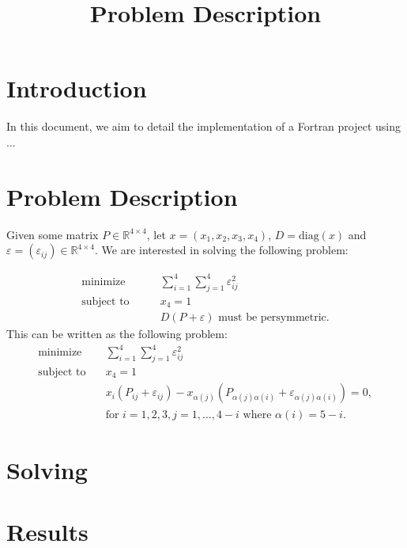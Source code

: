 \documentclass[12pt]{article}
\title{Problem Description}
\begin{document}
\maketitle 

\section{Introduction}

In this document, we aim to detail the implementation of a Fortran project using ...


\section{Problem Description}

Given some matrix $P \in {\mathbb{R}}^{4\times 4}$, let $x=(x_1,x_2,x_3,x_4)$, $D = \text{diag}(x)$ and $\varepsilon = (\varepsilon_{ij}) \in \mathbb{R}^{4\times 4}$. We are interested in solving the following problem:

\begin{align*}
	\text{minimize} & \qquad \sum_{i=1}^4\sum_{j=1}^4 \varepsilon_{ij}^2\\
	\text{subject to} & \qquad x_4=1\\
    & \qquad D(P+\varepsilon) \text{ must be persymmetric.}
\end{align*}
This can be written as the following problem:
\begin{align*}
	\text{minimize} & \quad \sum_{i=1}^4\sum_{j=1}^4 \varepsilon_{ij}^2\\
	\text{subject to} & \quad x_4=1\\
	& \quad x_i (P_{ij}+\varepsilon_{ij}) - x_{\alpha(j)} (P_{\alpha(j)\alpha(i)}+\varepsilon_ {\alpha(j)\alpha(i)}) = 0,\\ 
    & \quad \text{for } i=1, 2, 3, j=1, \ldots, 4-i \text{ where } \alpha(i)=5-i.
\end{align*}


\section{Solving}

\section{Results}
\end{document}
